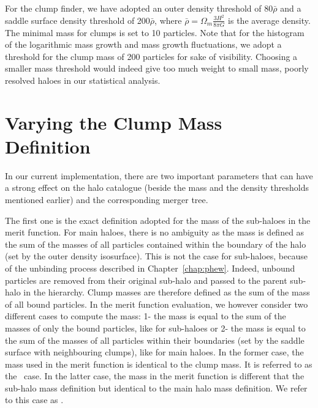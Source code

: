 For the clump finder, we have adopted an outer density
threshold of 80$\bar{\rho}$ and a saddle surface density threshold of
200$\bar{\rho}$, where $\bar{\rho} = \Omega_m \frac{3 H^2}{8 \pi G}$ is
the average density.  The minimal mass for clumps is set to 10
particles. Note that for the histogram of the logarithmic mass growth
and mass growth fluctuations, we adopt a threshold for the clump mass
of 200 particles for sake of visibility. Choosing a smaller mass
threshold would indeed give too much weight to small mass, poorly
resolved haloes in our statistical analysis.




\section{Varying the Clump Mass Definition}\label{chap:varying_clump_mass_definition}

In our current implementation, there are two important parameters that
can have a strong effect on the halo catalogue (beside the mass and
the density thresholds mentioned earlier) and the corresponding merger
tree.

The first one is the exact definition adopted for the mass of the
sub-haloes in the merit function.  For main haloes, there is no
ambiguity as the mass is defined as the sum of the masses of all
particles contained within the boundary of the halo (set by the outer
density isosurface). This is not the case for sub-haloes, because of the
unbinding process described in Chapter~\ref{chap:phew}. Indeed,
unbound particles are removed from their original sub-halo and passed
to the parent sub-halo in the hierarchy.  Clump masses are therefore
defined as the sum of the mass of all bound particles.  In the merit
function evaluation, we however consider two different cases to
compute the mass: 1- the mass is equal to the sum of the masses of
only the bound particles, like for sub-haloes or 2- the mass is equal
to the sum of the masses of all particles within their boundaries (set
by the saddle surface with neighbouring clumps), like for main haloes.
In the former case, the mass used in the merit function is identical
to the clump mass. It is referred to as the \exc\ case.  In the latter
case, the mass in the merit function is different that the sub-halo
mass definition but identical to the main halo mass definition.  We
refer to this case as \inc.

